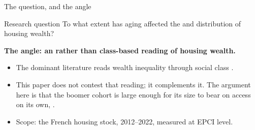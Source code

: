 \documentclass[aspectratio=169]{beamer}
\begin{document}
\begin{frame}{The question, and the angle}
    \begin{block}{Research question}
        To what extent has aging affected the  and
         distribution of housing wealth?
    \end{block}

    \vspace{0.4em}
    \textbf{The angle: an  rather than class-based reading of
    housing wealth.}

    \begin{itemize}
        \item The dominant literature reads wealth inequality through social
              class \citep{Piketty2019_capital_ideologie, Piketty2014_capital_is_back}.
        \item This paper does not contest that reading; it complements it. The
              argument here is that the boomer cohort is large enough for its
              size to bear on access on its own,
              .
        \item Scope: the  French housing stock, 2012--2022, measured
              at EPCI level.
    \end{itemize}
\end{frame}
\end{document}
